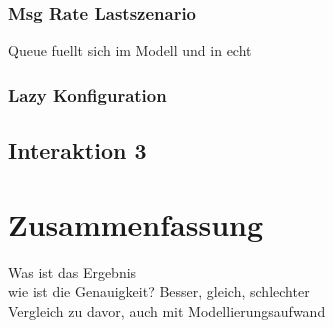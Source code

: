 \subsubsection{Msg Rate Lastszenario}
Queue fuellt sich im Modell und in echt
\subsubsection{Lazy Konfiguration}

\subsection{Interaktion 3}


\section{Zusammenfassung}
Was ist das Ergebnis \\
wie ist die Genauigkeit? Besser, gleich, schlechter\\
Vergleich zu davor, auch mit Modellierungsaufwand \\


